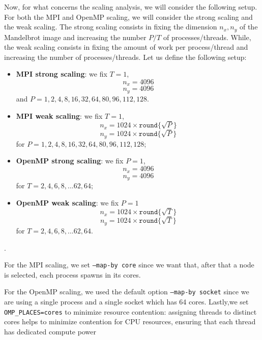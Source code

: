 Now, for what concerns the scaling analysis, we will consider the following setup. For both the MPI and OpenMP scaling, we will consider the strong scaling and the weak scaling. The strong scaling consists in fixing the dimension $n_x, n_y$ of the Mandelbrot image and increasing the number $P/T$ of processes/threads. While, the weak scaling consists in fixing the amount of work per process/thread and increasing the number of processes/threads.
Let us define the following setup:
\begin{itemize}
    \item \textbf{MPI strong scaling}: we fix $T=1$,
        $$n_x = 4096$$
        $$n_y = 4096$$
    and $P = 1, 2, 4, 8, 16, 32, 64, 80, 96, 112, 128$.
    \item \textbf{MPI weak scaling}: we fix $T=1$, 
        $$n_x = 1024 \times \texttt{round} \{\sqrt{P}\}$$
        $$n_y = 1024 \times \texttt{round}\{\sqrt{P}\}$$
    for $P = 1, 2, 4, 8, 16, 32, 64, 80, 96, 112, 128$;
    \item \textbf{OpenMP strong scaling}: we fix $P=1$,
        $$n_x = 4096$$
        $$n_y = 4096$$
    for $T = 2, 4, 6, 8, ... 62, 64$;
    \item \textbf{OpenMP weak scaling}: we fix $P=1$
        $$n_x = 1024 \times \texttt{round}\{\sqrt{T}\}$$
        $$n_y = 1024 \times \texttt{round}\{\sqrt{T}\}$$
    for $T = 2, 4, 6, 8, ... 62, 64$.
\end{itemize}.

For the MPI scaling, we set \texttt{--map-by core} since we want that, after that a node is selected, each process spawns in its cores.

For the OpenMP scaling, we used the default option \texttt{--map-by socket} since we are using a single process and a single socket which has 64 cores. Lastly,we set \texttt{OMP\_PLACES=cores} to minimize resource contention: assigning threads to distinct cores helps to minimize contention for CPU resources, ensuring that each thread has dedicated compute power